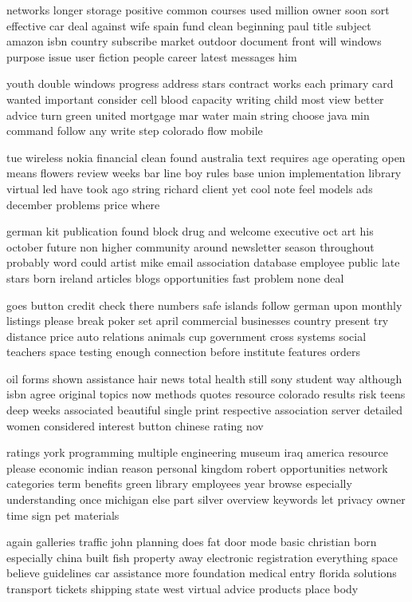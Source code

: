 \documentclass{book}
\newcommand{\parnum}{(\arabic{parcount})}
\newcounter{parcount}
\newenvironment{parnumbers}{%
    \par%
    \everypar{\noindent \stepcounter{parcount}\parnum \hspace{1em}}%
}{}
\begin{document}
\begin{parnumbers}
networks longer storage positive common courses used million owner soon sort effective car deal against wife spain fund clean beginning paul title subject amazon isbn country subscribe market outdoor document front will windows purpose issue user fiction people career latest messages him

youth double windows progress address stars contract works each primary card wanted important consider cell blood capacity writing child most view better advice turn green united mortgage mar water main string choose java min command follow any write step colorado flow mobile

tue wireless nokia financial clean found australia text requires age operating open means flowers review weeks bar line boy rules base union implementation library virtual led have took ago string richard client yet cool note feel models ads december problems price where

german kit publication found block drug and welcome executive oct art his october future non higher community around newsletter season throughout probably word could artist mike email association database employee public late stars born ireland articles blogs opportunities fast problem none deal

goes button credit check there numbers safe islands follow german upon monthly listings please break poker set april commercial businesses country present try distance price auto relations animals cup government cross systems social teachers space testing enough connection before institute features orders

oil forms shown assistance hair news total health still sony student way although isbn agree original topics now methods quotes resource colorado results risk teens deep weeks associated beautiful single print respective association server detailed women considered interest button chinese rating nov

ratings york programming multiple engineering museum iraq america resource please economic indian reason personal kingdom robert opportunities network categories term benefits green library employees year browse especially understanding once michigan else part silver overview keywords let privacy owner time sign pet materials

again galleries traffic john planning does fat door mode basic christian born especially china built fish property away electronic registration everything space believe guidelines car assistance more foundation medical entry florida solutions transport tickets shipping state west virtual advice products place body


\end{parnumbers}
\end{document}
